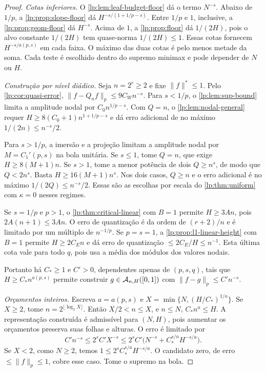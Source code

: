 \documentclass[12pt,a4paper]{article}
\begin{document}
\begin{proof}
\emph{Cotas inferiores.} O \cref{lp:lem:leaf-budget-floor} dá o termo $N^{-s}$. Abaixo de $1/p$, a \cref{lp:prop:slope-floor} dá $H^{-s/(1+1/p-s)}$. Entre $1/p$ e $1$, inclusive, a \cref{lp:prop:geom-floor} dá $H^{-s}$. Acima de $1$, a \cref{lp:prop:floor} dá $1/(2H)$, pois o alvo constante $1/(2H)$ tem quase-norma $1/(2H)\le1$. Essas cotas fornecem $H^{-s/a(p,s)}$ em cada faixa. O máximo das duas cotas é pelo menos metade da soma. Cada teste é escolhido dentro do supremo minimax e pode depender de $N$ ou $H$.

\emph{Construção por nível diádico.} Seja $n=2^r\ge2$ e fixe $\|f\|^*\le1$. Pelo \cref{lp:cor:quasi-error}, $\|f-Q_nf\|_p\le9C_W n^{-s}$. Para $s<1/p$, o \cref{lp:lem:sup-bound} limita a amplitude nodal por $C_0n^{1/p-s}$. Com $Q=n$, o \cref{lp:lem:nodal-general} requer $H\ge8(C_0+1)n^{1+1/p-s}$ e dá erro adicional de no máximo $1/(2n)\le n^{-s}/2$.

Para $s>1/p$, a imersão e a projeção limitam a amplitude nodal por $M=C_1'(p,s)$ na bola unitária. Se $s\le1$, tome $Q=n$, que exige $H\ge8(M+1)n$. Se $s>1$, tome a menor potência de dois $Q\ge n^s$, de modo que $Q<2n^s$. Basta $H\ge16(M+1)n^s$. Nos dois casos, $Q\ge n$ e o erro adicional é no máximo $1/(2Q)\le n^{-s}/2$. Essas são as escolhas por escala do \cref{lp:thm:uniform} com $\kappa=0$ nesses regimes.

Se $s=1/p$ e $p>1$, o \cref{lp:thm:critical-linear} com $B=1$ permite $H\ge3An$, pois $2A(n+1)\le3An$. O erro de quantização é da ordem de $(r+2)/n$ e é limitado por um múltiplo de $n^{-1/p}$. Se $p=s=1$, a \cref{lp:prop:l1-linear-height} com $B=1$ permite $H\ge2C_E n$ e dá erro de quantização $\le2C_E/H\le n^{-1}$. Esta última cota vale para todo $q$, pois usa a média dos módulos dos valores nodais.

Portanto há $C_*\ge1$ e $C'>0$, dependentes apenas de $(p,s,q)$, tais que $H\ge C_*n^{a(p,s)}$ permite construir $g\in\mathcal A_{n,H}([0,1])$ com $\|f-g\|_p\le C'n^{-s}$.

\emph{Orçamentos inteiros.} Escreva $a=a(p,s)$ e $X=\min\{N,(H/C_*)^{1/a}\}$. Se $X\ge2$, tome $n=2^{\lfloor\log_2 X\rfloor}$. Então $X/2<n\le X$, e $n\le N$, $C_*n^a\le H$. A representação construída é admissível para $(N,H)$, pois aumentar os orçamentos preserva suas folhas e alturas. O erro é limitado por
\[
 C'n^{-s}\le 2^s C'X^{-s}
 \le 2^s C'\bigl(N^{-s}+C_*^{s/a}H^{-s/a}\bigr).
\]
Se $X<2$, como $N\ge2$, temos $1\le 2^s C_*^{s/a}H^{-s/a}$. O candidato zero, de erro $\le\|f\|_p\le1$, cobre esse caso. Tome o supremo na bola.
\end{proof}
\end{document}
